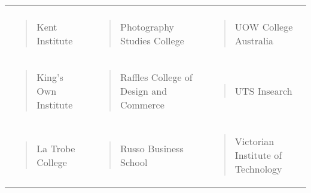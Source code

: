 \documentclass[]{book}
\begin{document}
\begin{longtable}[]{@{}lll@{}}
\begin{minipage}[t]{0.32\columnwidth}
\end{minipage}\tabularnewline
\begin{minipage}[t]{0.32\columnwidth}\raggedright
\begin{quote}
Kent Institute
\end{quote}\strut
\end{minipage} & \begin{minipage}[t]{0.32\columnwidth}\raggedright
\begin{quote}
Photography Studies College
\end{quote}\strut
\end{minipage} & \begin{minipage}[t]{0.32\columnwidth}\raggedright
\begin{quote}
UOW College Australia
\end{quote}\strut
\end{minipage}\tabularnewline
\begin{minipage}[t]{0.32\columnwidth}\raggedright
\begin{quote}
King's Own Institute
\end{quote}\strut
\end{minipage} & \begin{minipage}[t]{0.32\columnwidth}\raggedright
\begin{quote}
Raffles College of Design and Commerce
\end{quote}\strut
\end{minipage} & \begin{minipage}[t]{0.32\columnwidth}\raggedright
\begin{quote}
UTS Insearch
\end{quote}\strut
\end{minipage}\tabularnewline
\begin{minipage}[t]{0.32\columnwidth}\raggedright
\begin{quote}
La Trobe College
\end{quote}\strut
\end{minipage} & \begin{minipage}[t]{0.32\columnwidth}\raggedright
\begin{quote}
Russo Business School
\end{quote}\strut
\end{minipage} & \begin{minipage}[t]{0.32\columnwidth}\raggedright
\begin{quote}
Victorian Institute of Technology
\end{quote}\strut
\end{minipage}\tabularnewline

\end{longtable}
\end{document}
